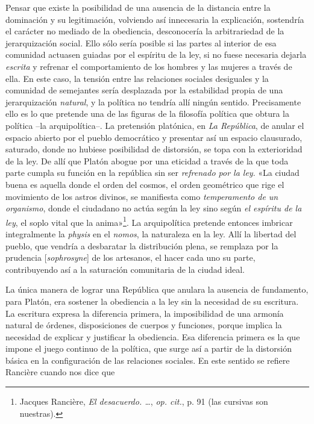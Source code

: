 Pensar que existe la posibilidad de una ausencia de la distancia entre la dominación y su legitimación, volviendo así innecesaria la explicación, sostendría el carácter no mediado de la obediencia, desconocería la arbitrariedad de la jerarquización social. Ello sólo sería posible si las partes al interior de esa comunidad actuasen guiadas por el espíritu de la ley, si no fuese necesaria dejarla \emph{escrita} y refrenar el comportamiento de los hombres y las mujeres a través de ella. En este caso, la tensión entre las relaciones sociales desiguales y la comunidad de semejantes sería desplazada por la estabilidad propia de una jerarquización \emph{natural}, y la política no tendría allí ningún sentido. Precisamente ello es lo que pretende una de las figuras de la filosofía política que obtura la política --la arquipolítica--. La pretensión platónica, en \emph{La República}, de anular el espacio abierto por el pueblo democrático y presentar así un espacio clausurado, saturado, donde no hubiese posibilidad de distorsión, se topa con la exterioridad de la ley. De allí que Platón abogue por una eticidad a través de la que toda parte cumpla su función en la república sin ser \emph{refrenado por la ley}. «La ciudad buena es aquella donde el orden del cosmos, el orden geométrico que rige el movimiento de los astros divinos, se manifiesta como \emph{temperamento de un organismo}, donde el ciudadano no actúa según la ley sino según \emph{el espíritu de la ley}, el soplo vital que la anima»\footnote{Jacques Rancière, \emph{El desacuerdo. \ldots{}}, \emph{op. cit.}, p. 91 (las cursivas son nuestras).}. La arquipolítica pretende entonces imbricar integralmente la \emph{physis} en el \emph{nomos}, la naturaleza en la ley. Allí la libertad del pueblo, que vendría a desbaratar la distribución plena, se remplaza por la prudencia {[}\emph{sophrosyne}{]} de los artesanos, el hacer cada uno su parte, contribuyendo así a la saturación comunitaria de la ciudad ideal.

La única manera de lograr una República que anulara la ausencia de fundamento, para Platón, era sostener la obediencia a la ley sin la necesidad de su escritura. La escritura expresa la diferencia primera, la imposibilidad de una armonía natural de órdenes, disposiciones de cuerpos y funciones, porque implica la necesidad de explicar y justificar la obediencia. Esa diferencia primera es la que impone el juego continuo de la política, que surge así a partir de la distorsión básica en la configuración de las relaciones sociales. En este sentido se refiere Rancière cuando nos dice que

